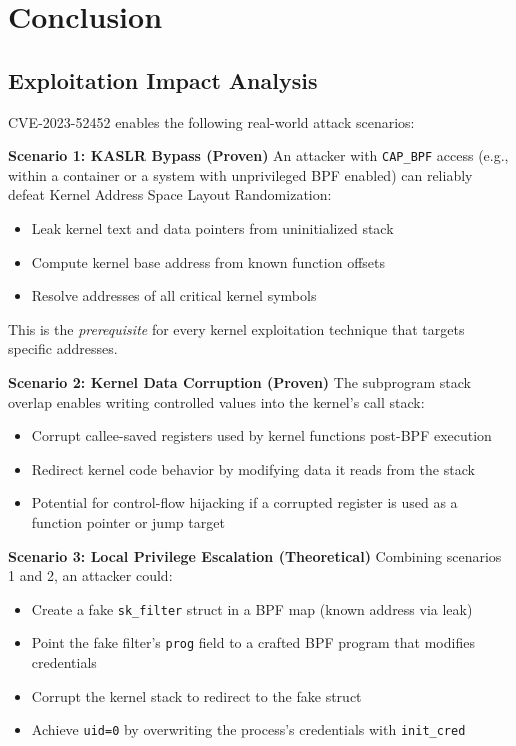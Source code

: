 \section{Conclusion}

\subsection{Exploitation Impact Analysis}

CVE-2023-52452 enables the following real-world attack scenarios:

\textbf{Scenario 1: KASLR Bypass (Proven)}
An attacker with \texttt{CAP\_BPF} access (e.g., within a container or a system with unprivileged BPF enabled) can reliably defeat Kernel Address Space Layout Randomization:
\begin{itemize}
    \item Leak kernel text and data pointers from uninitialized stack
    \item Compute kernel base address from known function offsets
    \item Resolve addresses of all critical kernel symbols
\end{itemize}
This is the \emph{prerequisite} for every kernel exploitation technique that targets specific addresses.

\textbf{Scenario 2: Kernel Data Corruption (Proven)}
The subprogram stack overlap enables writing controlled values into the kernel's call stack:
\begin{itemize}
    \item Corrupt callee-saved registers used by kernel functions post-BPF execution
    \item Redirect kernel code behavior by modifying data it reads from the stack
    \item Potential for control-flow hijacking if a corrupted register is used as a function pointer or jump target
\end{itemize}

\textbf{Scenario 3: Local Privilege Escalation (Theoretical)}
Combining scenarios 1 and 2, an attacker could:
\begin{itemize}
    \item Create a fake \texttt{sk\_filter} struct in a BPF map (known address via leak)
    \item Point the fake filter's \texttt{prog} field to a crafted BPF program that modifies credentials
    \item Corrupt the kernel stack to redirect to the fake struct
    \item Achieve \texttt{uid=0} by overwriting the process's credentials with \texttt{init\_cred}
\end{itemize}

